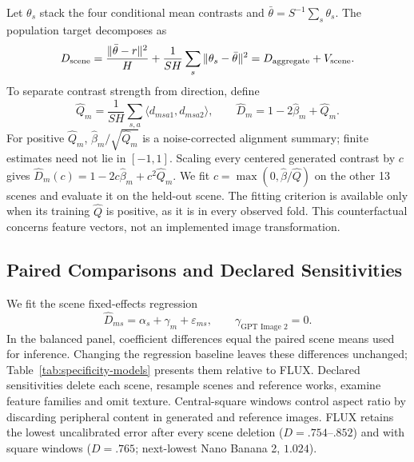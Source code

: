 Let $\theta_s$ stack the four conditional mean contrasts and
$\bar\theta=S^{-1}\sum_s\theta_s$. The population target decomposes as
\begin{equation}
 D_{\rm scene}=\frac{\|\bar\theta-r\|^2}{H}
 +\frac1{SH}\sum_s\|\theta_s-\bar\theta\|^2
 =D_{\rm aggregate}+V_{\rm scene}.
 \label{eq:scene-decomposition}
\end{equation}
To separate contrast strength from direction, define
\begin{equation}
 \widehat Q_m=\frac1{SH}\sum_{s,a}\langle d_{msa1},d_{msa2}\rangle,
 \qquad \widehat D_m=1-2\widehat\beta_m+\widehat Q_m.
 \label{eq:magnitude}
\end{equation}
For positive $\widehat Q_m$, $\widehat\beta_m/\sqrt{\widehat Q_m}$ is a
noise-corrected alignment summary; finite estimates need not lie in $[-1,1]$.
Scaling every centered generated contrast by $c$ gives
$\widehat D_m(c)=1-2c\widehat\beta_m+c^2\widehat Q_m$.
We fit $c=\max(0,\widehat\beta/\widehat Q)$ on the other 13 scenes and evaluate
it on the held-out scene. The fitting criterion is available only when its
training $\widehat Q$ is positive, as it is in every observed fold. This
counterfactual concerns feature vectors, not an implemented image transformation.

\subsection{Paired Comparisons and Declared Sensitivities}\label{app:declared-sensitivities}
We fit the scene fixed-effects regression
\begin{equation}
 \widehat D_{ms}=\alpha_s+\gamma_m+\varepsilon_{ms},
 \qquad\gamma_{\text{GPT Image 2}}=0.
 \label{eq:regression}
\end{equation}
In the balanced panel, coefficient differences equal the paired scene means
used for inference. Changing the regression baseline leaves these differences
unchanged; Table~\ref{tab:specificity-models} presents them relative to FLUX.
Declared sensitivities delete each scene, resample scenes
and reference works, examine feature families and omit texture. Central-square
windows control aspect ratio by discarding peripheral content in generated and
reference images. FLUX retains the lowest uncalibrated error after every scene
deletion ($D=.754$--$.852$) and with square windows ($D=.765$; next-lowest
Nano Banana 2, $1.024$).

